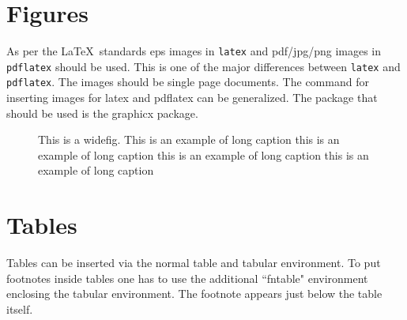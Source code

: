 \documentclass[journal=eds]{CAM-MODERN}%
\theoremstyle{definition}
\numberwithin{equation}{section}
\begin{document}
\section{Figures}

As per the \LaTeX\ standards eps images in \verb!latex! and pdf/jpg/png images in
\verb!pdflatex! should be used. This is one of the major differences between \verb!latex!
and \verb!pdflatex!. The images should be single page documents. The command for inserting images
for latex and pdflatex can be generalized. The package that should be used
is the graphicx package.

\begin{figure}[t]%
{\caption{This is a widefig. This is an example of long caption this is an example of long caption  this is an example of long caption this is an example of long caption}
\label{fig1}}
\end{figure}



\section{Tables}

Tables can be inserted via the normal table and tabular environment. To put
footnotes inside tables one has to use the additional ``fntable" environment
enclosing the tabular environment. The footnote appears just below the table
itself.
\end{document}
